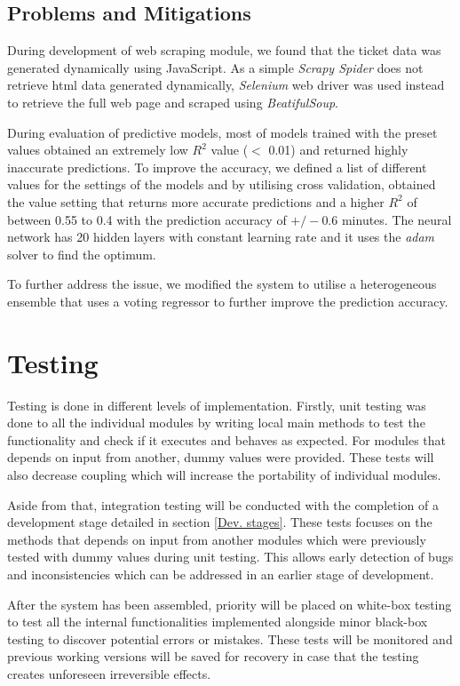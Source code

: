 \documentclass[11pt]{article}
\begin{document}
\subsection{Problems and Mitigations} \label{Problems}
During development of web scraping module, we found that the ticket data was generated dynamically using JavaScript. As a simple \textit{Scrapy Spider} does not retrieve html data generated dynamically, \textit{Selenium} web driver was used instead to retrieve the full web page and scraped using \textit{BeatifulSoup}.

During evaluation of predictive models, most of models trained with the preset values obtained an extremely low $R^2$ value ($<$ 0.01) and returned highly inaccurate predictions. To improve the accuracy, we defined a list of different values for the settings of the models and by utilising cross validation, obtained the value setting that returns more accurate predictions and a higher $R^2$ of between 0.55 to 0.4 with the prediction accuracy of $+/-0.6$ minutes. The neural network has 20 hidden layers with constant learning rate and it uses the \textit{adam} solver to find the optimum.

To further address the issue, we modified the system to utilise a heterogeneous ensemble that uses a voting regressor to further improve the prediction accuracy.

\section{Testing}
Testing is done in different levels of implementation. Firstly, unit testing was done to all the individual modules by writing local main methods to test the functionality and check if it executes and behaves as expected. For modules that depends on input from another, dummy values were provided. These tests will also decrease coupling which will increase the portability of individual modules.

Aside from that, integration testing will be conducted with the completion of a development stage detailed in section \ref{Dev. stages}. These tests focuses on the methods that depends on input from another modules which were previously tested with dummy values during unit testing. This allows early detection of bugs and inconsistencies which can be addressed in an earlier stage of development.

After the system has been assembled, priority will be placed on white-box testing to test all the internal functionalities implemented alongside minor black-box testing to discover potential errors or mistakes. These tests will be monitored and previous working versions will be saved for recovery in case that the testing creates unforeseen irreversible effects.
\end{document}
